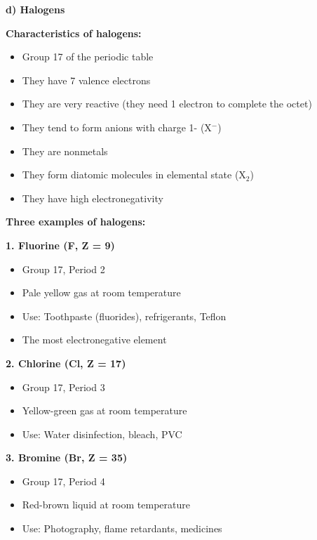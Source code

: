 \begin{exercise}
\begin{solu}
        \textbf{d) Halogens}

        \textbf{Characteristics of halogens:}
        \begin{itemize}
            \item Group 17 of the periodic table
            \item They have 7 valence electrons
            \item They are very reactive (they need 1 electron to complete the octet)
            \item They tend to form anions with charge 1- (X\(^-\))
            \item They are nonmetals
            \item They form diatomic molecules in elemental state (X\(_2\))
            \item They have high electronegativity
        \end{itemize}

        \textbf{Three examples of halogens:}

        \textbf{1. Fluorine (F, Z = 9)}
        \begin{itemize}
            \item Group 17, Period 2
            \item Pale yellow gas at room temperature
            \item Use: Toothpaste (fluorides), refrigerants, Teflon
            \item The most electronegative element
        \end{itemize}

        \textbf{2. Chlorine (Cl, Z = 17)}
        \begin{itemize}
            \item Group 17, Period 3
            \item Yellow-green gas at room temperature
            \item Use: Water disinfection, bleach, PVC
        \end{itemize}

        \textbf{3. Bromine (Br, Z = 35)}
        \begin{itemize}
            \item Group 17, Period 4
            \item Red-brown liquid at room temperature
            \item Use: Photography, flame retardants, medicines
        \end{itemize}


\end{solu}
\end{exercise}
